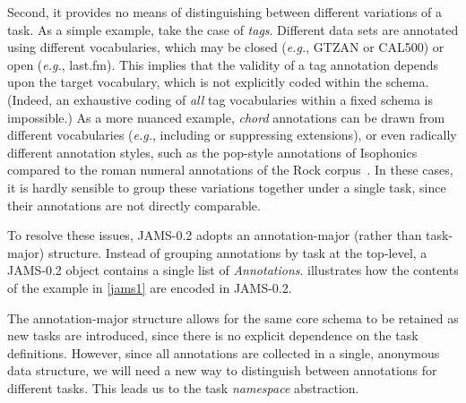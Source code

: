 \documentclass{article}
\begin{document}
Second, it provides no means of distinguishing between different variations of a task.
As a simple example, take the case of \emph{tags}.
Different data sets are annotated using different vocabularies, which may be closed
(\emph{e.g.}, GTZAN or CAL500) or open (\emph{e.g.}, last.fm).
This implies that the validity of a tag annotation depends upon the target vocabulary, which is not explicitly coded within the schema.
(Indeed, an exhaustive coding of \emph{all} tag vocabularies within a fixed schema is impossible.) 
As a more nuanced example, \emph{chord} annotations can be drawn from different vocabularies (\emph{e.g.}, including or suppressing extensions),
or even radically different annotation styles, such as the pop-style annotations of
Isophonics~\cite{isophonicsbeatles} compared to the roman numeral annotations of the
Rock corpus~\cite{de2011corpus}.
In these cases, it is hardly sensible to group these variations together under a single task, since their annotations are not directly
comparable.

To resolve these issues, JAMS-0.2 adopts an an\-notation-major (rather than task-major) structure.
Instead of grouping annotations by task at the top-level, a JAMS-0.2 object contains a single list of \emph{Annotations}.
 illustrates how the contents of the example in \cref{jams1} are encoded in
JAMS-0.2.

The annotation-major structure allows for the same core schema to be retained as new tasks 
are introduced, since there is no explicit dependence on the task definitions.
However, since all annotations are collected in a single, anonymous data structure, we will need a new way to distinguish between annotations for different tasks.
This leads us to the task \emph{namespace} abstraction.
\end{document}

